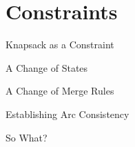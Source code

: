 \documentclass[aspectratio=169,compress,10pt]{beamer}
\begin{document}
\section{Constraints}

\begin{frame}{Knapsack as a Constraint}
\end{frame}

\begin{frame}{A Change of States}
\end{frame}

\begin{frame}{A Change of Merge Rules}
\end{frame}

\begin{frame}{Establishing Arc Consistency}
\end{frame}

\begin{frame}{So What?}
\end{frame}
\end{document}
